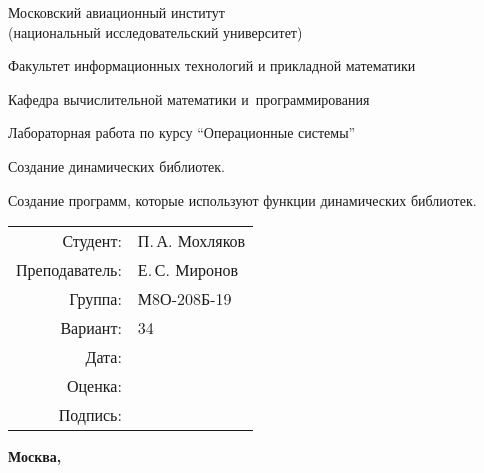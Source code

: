 \documentclass[pdf, unicode, 12pt, a4paper,oneside,fleqn]{article}
\begin{document}
\begin{titlepage}
    \begin{center}
        \bfseries

        {\Large Московский авиационный институт\\ (национальный исследовательский университет)}
        
        \vspace{48pt}
        
        {\large Факультет информационных технологий и прикладной математики}
        
        \vspace{36pt}
        
        {\large Кафедра вычислительной математики и~программирования}
        
        \vspace{48pt}
        
        Лабораторная работа  по курсу \enquote{Операционные системы}

        \vspace{48pt}

        Создание динамических библиотек. 
        
        Создание программ, которые используют функции динамических библиотек.
    \end{center}
    
    \vspace{125pt}
    
    \begin{flushright}
    \begin{tabular}{rl}
    Студент: & П.\,А. Мохляков \\
    Преподаватель: & Е.\,С. Миронов \\
    Группа: & М8О-208Б-19 \\
    Вариант: & 34 \\
    Дата: & \\
    Оценка: & \\
    Подпись: & \\
    \end{tabular}
    \end{flushright}
    
    \vfill
    
    \begin{center}
    \bfseries
    Москва, \the\year
    \end{center}
\end{titlepage}
    
\pagebreak
\end{document}
